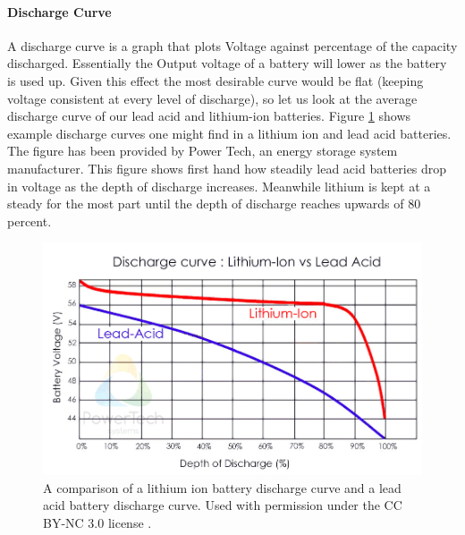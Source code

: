 \paragraph{Discharge Curve}
A discharge curve is a graph that plots Voltage against percentage of the capacity discharged. Essentially the Output voltage of a battery will lower as the battery is used up. Given this effect the most desirable curve would be flat (keeping voltage consistent at every level of discharge), so let us look at the average discharge curve of our lead acid and lithium-ion batteries. Figure \ref{fig:discharge-curve} shows example discharge curves one might find in a lithium ion and lead acid batteries. The figure has been provided by Power Tech, an energy storage system manufacturer. This figure shows first hand how steadily lead acid batteries drop in voltage as the depth of discharge increases. Meanwhile lithium is kept at a steady for the most part until the depth of discharge reaches upwards of 80 percent.
\cite{Battery-Cell-Comparison}
\begin{figure}
    \centering
    \includegraphics[scale=0.4]{figures/discharge curve.png}
    \caption{A comparison of a lithium ion battery discharge curve and a lead acid battery discharge curve. Used with permission under the CC BY-NC 3.0 license \cite{lithium-dis-ref}.}
    \label{fig:discharge-curve} 
\end{figure}

